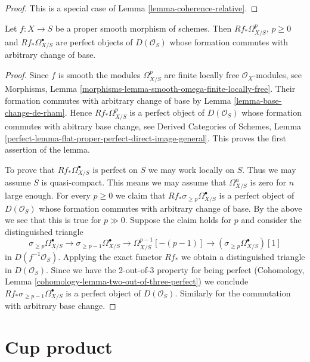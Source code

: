 \begin{proof}
This is a special case of Lemma \ref{lemma-coherence-relative}.
\end{proof}

\begin{lemma}
\label{lemma-proper-smooth-de-Rham}
Let $f : X \to S$ be a proper smooth morphism of schemes. Then
$Rf_*\Omega^p_{X/S}$, $p \geq 0$ and $Rf_*\Omega^\bullet_{X/S}$ are
perfect objects of $D(\mathcal{O}_S)$ whose formation commutes
with arbitrary change of base.
\end{lemma}

\begin{proof}
Since $f$ is smooth the modules $\Omega^p_{X/S}$ are finite locally
free $\mathcal{O}_X$-modules, see Morphisms, Lemma
\ref{morphisms-lemma-smooth-omega-finite-locally-free}. Their
formation commutes with arbitrary change of base by
Lemma \ref{lemma-base-change-de-rham}. Hence
$Rf_*\Omega^p_{X/S}$ is a perfect object of $D(\mathcal{O}_S)$
whose formation commutes with abitrary base change, see
Derived Categories of Schemes, Lemma
\ref{perfect-lemma-flat-proper-perfect-direct-image-general}.
This proves the first assertion of the lemma.

\medskip\noindent
To prove that $Rf_*\Omega^\bullet_{X/S}$ is perfect on $S$ we may work
locally on $S$. Thus we may assume $S$ is quasi-compact. This means
we may assume that $\Omega^n_{X/S}$ is zero for $n$ large enough.
For every $p \geq 0$ we claim that
$Rf_*\sigma_{\geq p}\Omega^\bullet_{X/S}$ is a
perfect object of $D(\mathcal{O}_S)$ whose formation commutes
with arbitrary change of base. By the above we see that
this is true for $p \gg 0$. Suppose the claim holds for $p$
and consider the distinguished triangle
$$
\sigma_{\geq p}\Omega^\bullet_{X/S} \to
\sigma_{\geq p - 1}\Omega^\bullet_{X/S} \to
\Omega^{p - 1}_{X/S}[-(p - 1)] \to
(\sigma_{\geq p}\Omega^\bullet_{X/S})[1]
$$
in $D(f^{-1}\mathcal{O}_S)$.
Applying the exact functor $Rf_*$ we obtain a distinguished triangle
in $D(\mathcal{O}_S)$.
Since we have the 2-out-of-3 property for being perfect
(Cohomology, Lemma \ref{cohomology-lemma-two-out-of-three-perfect})
we conclude $Rf_*\sigma_{\geq p - 1}\Omega^\bullet_{X/S}$ is a
perfect object of $D(\mathcal{O}_S)$. Similarly for the
commutation with arbitrary base change.
\end{proof}





\section{Cup product}
\label{section-cup-product}

